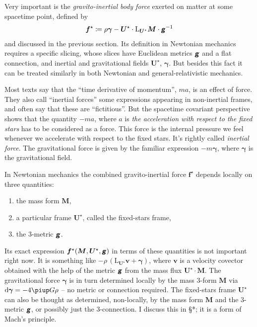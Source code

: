 \documentclass[\ifafour a4paper,12pt,\else a5paper,10pt,\fi%
onecolumn,oneside,article,%
british%
]{memoir}
\theoremstyle{remark}
\theoremstyle{innote}
\newcommand*{\mathte}[1]{\textbf{\textit{\textsf{#1}}}}
\newcommand*{\de}{\partialup}%
\newcommand*{\pu}{\piup}%
\newcommand*{\di}{\mathrm{d}}%
\newcommand*{\defd}{\coloneqq}
\renewcommand*{\|}{\nonscript\,\vert\nonscript\;\mathopen{}}
\newcommand*{\sect}{\S}%
\newcommand*{\Li}{\mathrm{L}}
\newcommand*{\ydd}{\rho}
\newcommand*{\yd}{\ydd}
\newcommand*{\yrr}{M}
\newcommand*{\yr}{\bm{\yrr}}
\newcommand*{\ybb}{f}
\newcommand*{\yb}{\bm{\ybb}}
\newcommand*{\ybi}{\yb^{\mathord{\star}}}
\newcommand*{\yxxt}{x}
\newcommand*{\yxt}{\bm{\yxxt}}
\newcommand*{\yxto}{\bm{\yxxt}^{\mathord{\star}}}
\newcommand*{\yvvt}{v}
\newcommand*{\yvt}{\bm{\yvvt}}
\newcommand*{\yffg}{\gamma}
\newcommand*{\yfg}{\bm{\yffg}}
\newcommand*{\yomm}{\varOmega}
\newcommand*{\yom}{\bm{\yomm}^{\mathord{\star}}}
\newcommand*{\yFF}{U}
\newcommand*{\yF}{\bm{\yFF}}
\newcommand*{\yFi}{\yF^{\mathord{\star}}}
\newcommand*{\ygg}{g}
\newcommand*{\yg}{\mathte{\ygg}}
\begin{document}
Very important is the \emph{gravito-inertial body force} exerted on matter at some spacetime point, defined by 
\begin{equation}
  \label{eq:gravito-inertial_force_tentative}
  \ybi \defd \yd\yfg - \yFi \cdot \Li_{\yFi}\yr \cdot \yg^{-1}
\end{equation}
and discussed in the previous section. Its definition in Newtonian
mechanics requires a specific slicing, whose slices have Euclidean
metrics $\yg$ and a flat connection, and inertial and gravitational fields
$\yFi$, $\yfg$. But besides this fact it can be treated similarly in both
Newtonian and general-relativistic mechanics.

Most texts say that the \enquote{time derivative of momentum}, $ma$, is an
effect of force. They also call \enquote{inertial forces} some expressions
appearing in non-inertial frames, and often say that these are
\enquote{fictitious}. But the spacetime covariant perspective shows that
the quantity $-ma$, where $a$ is \emph{the acceleration with respect to the
  fixed stars} has to be considered as a force. This force is the internal
pressure we feel whenever we accelerate with respect to the fixed stars.
It's rightly called \emph{inertial force}. The gravitational force is given
by the familiar expression $-m \yfg$, where $\yfg$ is the gravitational
field.


In Newtonian mechanics the combined gravito-inertial force $\ybi$ depends
locally on three quantities:
\begin{enumerate}[label=(\arabic*)]\tightlist
\item the mass form $\yr$,
\item a particular frame $\yFi$, called the fixed-stars frame,
\item the 3-metric $\yg$.
\end{enumerate}
Its exact expression $\ybi(\yr,\yFi,\yg)$ in terms of these quantities is
not important right now. It is something like
$-\yd \,(\Li_{\yFi}\yvt + \yfg)$, where $\yvt$ is a velocity covector
obtained with the help of the metric $\yg$ from the mass flux
$\yFi\cdot\yr$. The gravitational force $\yfg$ is in turn determined
locally by the mass 3-form $\yr$ via $\di\yfg = - 4\pu G \yd$ -- no metric
or connection required. The fixed-stars frame $\yFi$ can also be thought as
determined, non-locally, by the mass form $\yr$ and the 3-metric $\yg$, or
possibly just the 3-connection. I discuss this in \sect**; it is a form of
Mach's principle.
\end{document}
